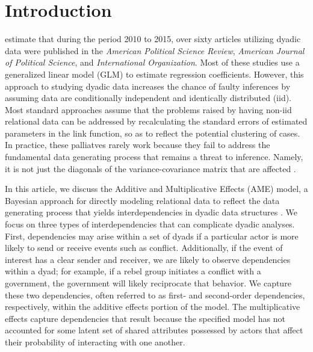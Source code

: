 \section{\textbf{Introduction}}

\citet{aronow:etal:2015} estimate that during the period 2010 to 2015, over sixty articles utilizing dyadic data were published in the \textit{American Political Science Review}, \textit{American Journal of Political Science}, and \textit{International Organization}. Most of these studies use a generalized linear model (GLM) to estimate regression coefficients.  However, this approach to studying dyadic data increases the chance of faulty inferences by assuming data are conditionally independent and identically distributed (iid). Most standard approaches assume that the problems raised by having non-iid relational data can be addressed by recalculating the standard errors of estimated parameters in the link function, so as to reflect the potential clustering of cases. In practice, these palliatves rarely work because they fail to address the fundamental data generating process that remains a threat to inference. Namely, it is not just the diagonals of the variance-covariance matrix that are affected \citep{beck:2012, king:roberts:2014}.

In this article, we discuss the Additive and Multiplicative Effects (AME) model, a Bayesian approach for directly modeling relational data to reflect the data generating process that yields interdependencies in dyadic data structures \citep{hoff:2008,minhas:etal:2016:arxiv}. We focus on three types of interdependencies that can complicate dyadic analyses. First, dependencies may arise within a set of dyads if a particular actor is more likely to send or receive events such as conflict. Additionally, if the event of interest has a clear sender and receiver, we are likely to observe dependencies within a dyad; for example, if a rebel group initiates a conflict with a government, the government will likely reciprocate that behavior. We capture these two dependencies, often referred to as first- and second-order dependencies, respectively, within the additive effects portion of the model. The multiplicative effects capture dependencies that result because the specified model has not accounted for some latent set of shared attributes possessed by actors that affect their probability of interacting with one another. 

